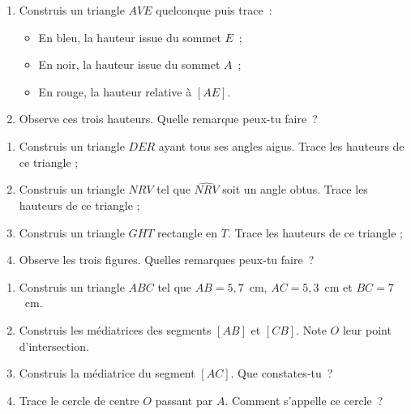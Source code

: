 \begin{exercice}
\begin{enumerate}
 \item Construis un triangle $AVE$ quelconque puis trace :
 \begin{itemize}
  \item En bleu, la hauteur issue du sommet $E$ ;
  \item En noir, la hauteur issue du sommet $A$ ;
  \item En rouge, la hauteur relative à $[AE]$.
  \end{itemize}
 \item Observe ces trois hauteurs. Quelle remarque peux-tu faire ?
 \end{enumerate}
\end{exercice}


\begin{exercice}
\begin{enumerate}
 \item Construis un triangle $DER$ ayant tous ses angles aigus. Trace les hauteurs de ce triangle ;
 \item Construis un triangle $NRV$ tel que $\widehat{NRV}$ soit un angle obtus. Trace les hauteurs de ce triangle ;
 \item Construis un triangle $GHT$ rectangle en $T$. Trace les hauteurs de ce triangle ;
 \item Observe les trois figures. Quelles remarques peux-tu faire ?
 \end{enumerate}
\end{exercice}


\begin{exercice}
\begin{enumerate}
 \item Construis un triangle $ABC$ tel que $AB = 5,7$ cm, $AC = 5,3$ cm et $BC = 7$ cm.
 \item Construis les médiatrices des segments $[AB]$ et $[CB]$. Note $O$ leur point d'intersection.
 \item Construis la médiatrice du segment $[AC]$. Que constates‑tu ?
 \item Trace le cercle de centre $O$ passant par $A$. Comment s'appelle ce cercle ?
 \end{enumerate}
\end{exercice}

\newpage


